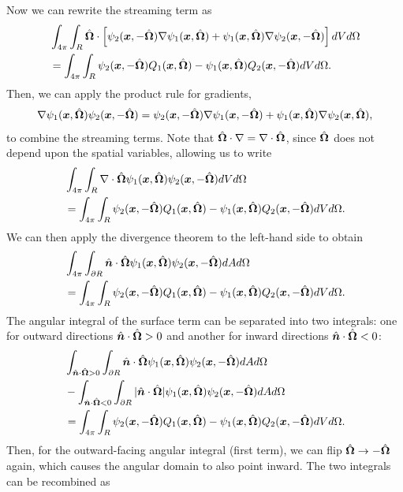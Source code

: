 Now we can rewrite the streaming term as
\begin{align}
  &\int_{4\pi} \int_R \hat{\mathbf{\Omega}} \cdot \left[ \psi_2(\bm{x},-\hat{\mathbf{\Omega}}) \nabla \psi_1(\bm{x},\hat{\mathbf{\Omega}}) + \psi_1(\bm{x},\hat{\mathbf{\Omega}}) \nabla \psi_2(\bm{x},-\hat{\mathbf{\Omega}}) \right] dV d\Omega \nonumber \\*
  &= \int_{4\pi} \int_R  \psi_2(\bm{x},-\hat{\mathbf{\Omega}}) Q_1(\bm{x},\hat{\mathbf{\Omega}}) - \psi_1(\bm{x},\hat{\mathbf{\Omega}}) Q_2(\bm{x},-\hat{\mathbf{\Omega}}) dV d\Omega.
\end{align}
Then, we can apply the product rule for gradients,
\begin{align}
  \nabla \psi_1(\bm{x},\hat{\mathbf{\Omega}}) \psi_2(\bm{x},-\hat{\mathbf{\Omega}}) = \psi_2(\bm{x},-\hat{\mathbf{\Omega}}) \nabla \psi_1(\bm{x},-\hat{\mathbf{\Omega}}) + \psi_1(\bm{x},\hat{\mathbf{\Omega}}) \nabla \psi_2(\bm{x},\hat{\mathbf{\Omega}}),
\end{align}
to combine the streaming terms. Note that $\hat{\mathbf{\Omega}} \cdot \nabla = \nabla \cdot \hat{\mathbf{\Omega}}$, since $\hat{\mathbf{\Omega}}$ does not depend upon the spatial variables, allowing us to write
\begin{align}
  &\int_{4\pi} \int_R \nabla \cdot \hat{\mathbf{\Omega}} \psi_1(\bm{x},\hat{\mathbf{\Omega}}) \psi_2(\bm{x},-\hat{\mathbf{\Omega}}) dV d\Omega \nonumber \\*
  &= \int_{4\pi} \int_R  \psi_2(\bm{x},-\hat{\mathbf{\Omega}}) Q_1(\bm{x},\hat{\mathbf{\Omega}}) - \psi_1(\bm{x},\hat{\mathbf{\Omega}}) Q_2(\bm{x},-\hat{\mathbf{\Omega}}) dV d\Omega.
\end{align}
We can then apply the divergence theorem to the left-hand side to obtain
\begin{align}
  &\int_{4\pi} \int_{\partial R} \hat{\bm{n}} \cdot \hat{\mathbf{\Omega}} \psi_1(\bm{x},\hat{\mathbf{\Omega}}) \psi_2(\bm{x},-\hat{\mathbf{\Omega}}) dA d\Omega \nonumber \\*
  &= \int_{4\pi} \int_R  \psi_2(\bm{x},-\hat{\mathbf{\Omega}}) Q_1(\bm{x},\hat{\mathbf{\Omega}}) - \psi_1(\bm{x},\hat{\mathbf{\Omega}}) Q_2(\bm{x},-\hat{\mathbf{\Omega}}) dV d\Omega.
\end{align}
The angular integral of the surface term can be separated into two integrals: one for outward directions $\hat{\bm{n}} \cdot \hat{\mathbf{\Omega}} > 0$ and another for inward directions $\hat{\bm{n}} \cdot \hat{\mathbf{\Omega}} < 0$:
\begin{align}
  &\int_{\hat{\bm{n}} \cdot \hat{\mathbf{\Omega}} > 0} \int_{\partial R} \hat{\bm{n}} \cdot \hat{\mathbf{\Omega}} \psi_1(\bm{x},\hat{\mathbf{\Omega}}) \psi_2(\bm{x},-\hat{\mathbf{\Omega}}) dA d\Omega \nonumber \\*
  &- \int_{\hat{\bm{n}} \cdot \hat{\mathbf{\Omega}} < 0} \int_{\partial R} |\hat{\bm{n}} \cdot \hat{\mathbf{\Omega}}| \psi_1(\bm{x},\hat{\mathbf{\Omega}}) \psi_2(\bm{x},-\hat{\mathbf{\Omega}}) dA d\Omega \nonumber \\*
  &= \int_{4\pi} \int_R  \psi_2(\bm{x},-\hat{\mathbf{\Omega}}) Q_1(\bm{x},\hat{\mathbf{\Omega}}) - \psi_1(\bm{x},\hat{\mathbf{\Omega}}) Q_2(\bm{x},-\hat{\mathbf{\Omega}}) dV d\Omega.
\end{align}
Then, for the outward-facing angular integral (first term), we can flip $\hat{\mathbf{\Omega}} \rightarrow -\hat{\mathbf{\Omega}}$ again, which causes the angular domain to also point inward. The two integrals can be recombined as

